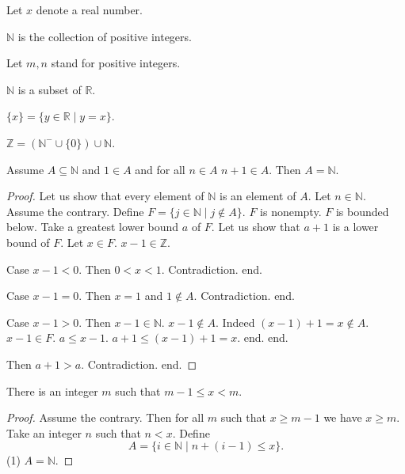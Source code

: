 \documentclass{article}
\begin{document}
\begin{forthel}
Let $x$ denote a real number.

\begin{definition}
$\mathbb{N}$ is the collection
of positive integers.
\end{definition}
Let $m,n$ stand for positive integers.

\begin{lemma}
$\mathbb{N}$ is a subset of $\mathbb{R}$.
\end{lemma}

\begin{definition}
$\{x\} = \{y \in \mathbb{R} \mid y = x\}$.
\end{definition}

\begin{lemma}
$\mathbb{Z} = (\mathbb{N}^- \cup \{0\}) \cup \mathbb{N}$.
\end{lemma}

\begin{theorem}[title=Induction Theorem]
Assume $A \subseteq \mathbb{N}$
and $1 \in A$ and for all $n \in A$ $n + 1 \in A$.
Then $A = \mathbb{N}$.
\end{theorem}

\begin{proof}
Let us show that every element of $\mathbb{N}$ is an element of $A$.
  Let $n \in \mathbb{N}$.
  Assume the contrary.
  Define $F = \{  j \in \mathbb{N} \mid j \notin A\}$.
  $F$ is nonempty. $F$ is bounded below.
  Take a greatest lower bound $a$ of $F$.
  Let us show that $a+1$ is a lower bound of $F$.
    Let $x \in F$. $x - 1 \in \mathbb{Z}$.

    Case $x - 1 < 0$. Then $0 < x < 1$. Contradiction. end.

    Case $x - 1 = 0$. Then $x = 1$ and $1 \notin A$. Contradiction. end.

    Case $x - 1 > 0$. Then $x - 1 \in \mathbb{N}$.
      $x - 1 \notin A$. Indeed $(x - 1) + 1 = x \notin A$. $x - 1 \in F$.
      $a \leq x - 1$.
      $a + 1 \leq (x - 1) + 1 = x$.
    end.
  end.

  Then $a+1 > a$.
  Contradiction.
end.
\end{proof}

\begin{lemma}
There is an integer $m$ such that
$m -1 \leq x < m$.
\end{lemma}
\begin{proof}
Assume the contrary.
Then for all $m$ such that $x \geq m-1 $ we have $x \geq m$.
Take an integer $n$ such that $n < x$.
Define
\[ A = \{i \in \mathbb{N} \mid n + (i - 1) \leq x\}. \]
(1) $A = \mathbb{N}$.


\end{proof}
\end{forthel}
\end{document}

